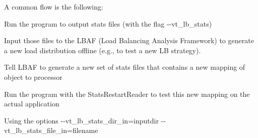 A common flow is the following\+:
\begin{DoxyItemize}
\item Run the program to output stats files (with the flag {\ttfamily -\/-\/vt\+\_\+lb\+\_\+stats})
\item Input those files to the L\+B\+AF (Load Balancing Analysis Framework) to generate a new load distribution offline (e.\+g., to test a new LB strategy).
\begin{DoxyItemize}
\item Tell L\+B\+AF to generate a new set of stats files that contains a new mapping of object to processor
\end{DoxyItemize}
\item Run the program with the {\ttfamily Stats\+Restart\+Reader} to test this new mapping on the actual application
\begin{DoxyItemize}
\item Using the options {\ttfamily -\/-\/vt\+\_\+lb\+\_\+stats\+\_\+dir\+\_\+in=inputdir -\/-\/vt\+\_\+lb\+\_\+stats\+\_\+file\+\_\+in=filename} 
\end{DoxyItemize}
\end{DoxyItemize}
